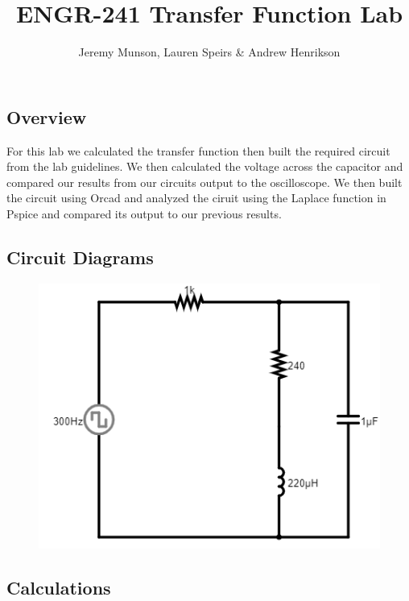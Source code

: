 \documentclass[11pt]{article}
\title{ENGR-241 Transfer Function Lab}
\author{Jeremy Munson, Lauren Speirs \& Andrew Henrikson}
\begin{document}
	\maketitle
	\subsection*{Overview}
	For this lab we calculated the transfer function then built the required circuit from the lab guidelines. We then calculated the voltage across the capacitor and compared our results from our circuits output to the oscilloscope. We then built the circuit using Orcad and analyzed the ciruit using the Laplace function in Pspice and compared its output to our previous results.
		\subsection*{Circuit Diagrams}
	
	\begin{figure}[H]
		\centering
		\includegraphics[width=5in]{images/diagram.png}
	\end{figure}
	
	\subsection*{Calculations}
	
\end{document}
